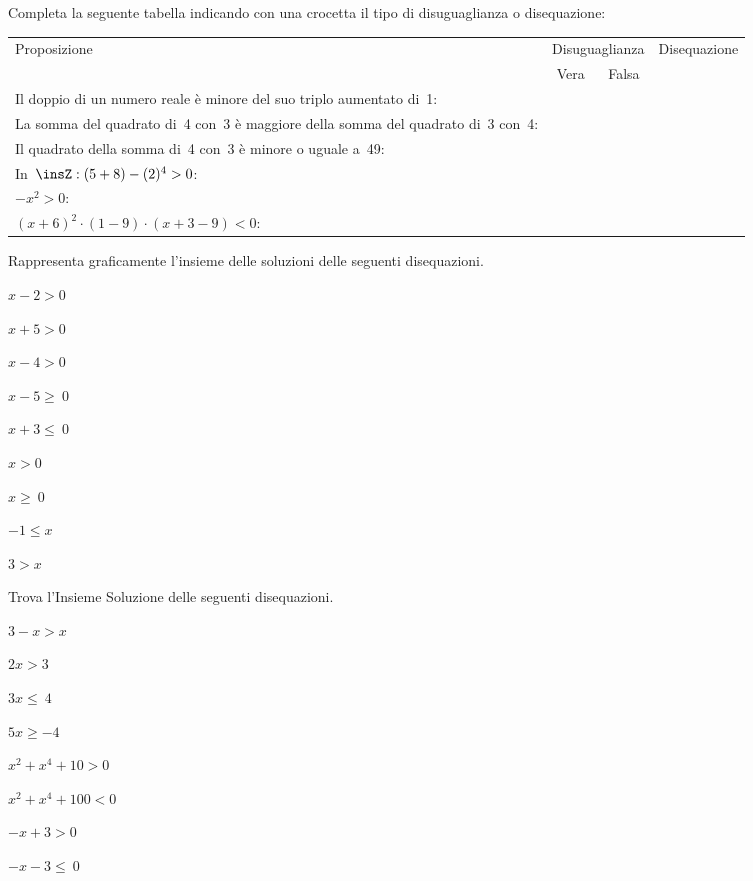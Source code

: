 \begin{esercizio}
 \label{ese:21.8}
Completa la seguente tabella indicando con una crocetta il tipo di
disuguaglianza o disequazione:

 \begin{tabularx}{.9\textwidth}{X|c|c|c|}
 \toprule
 Proposizione&\multicolumn{2}{c}{Disuguaglianza}& Disequazione\\
  & Vera & Falsa & \\
 \midrule
 Il doppio di un numero reale è minore del suo triplo aumentato di~1: & & & \\
 \midrule
 La somma del quadrato di~4 con~3 è maggiore della somma del quadrato di~3 con~4: & & &\\
 \midrule
 Il quadrato della somma di~4 con~3 è minore o uguale a~49: & & & \\
 \midrule
 In~$\insZ:(5+8)-(2)^{4}>0$: & & & \\
 \midrule
 $-x^{2}>0$: & & & \\
 \midrule
 $(x+6)^{2}\cdot (1-9)\cdot (x+3-9)<0$: & & & \\
 \bottomrule
 \end{tabularx}
\end{esercizio}

\begin{esercizio}
 \label{ese:21.9}
 Rappresenta graficamente l'insieme delle soluzioni
delle seguenti disequazioni.
\begin{multicols}{3}
 \begin{enumeratea}
 \item $x-2>0$
\item $x+5>0$
\item $x-4>0$
\item $x-5\ge~0$
\item $x+3\le~0$
\item $x>0$
\item $x\ge~0$
\item $-1\le x$
\item $3>x$
 \end{enumeratea}
\end{multicols}
\end{esercizio}

\begin{esercizio}[\Ast]
 \label{ese:21.10}
Trova l'Insieme Soluzione delle seguenti disequazioni.
\begin{multicols}{2}
 \begin{enumeratea}
 \item $3-x>x$
\item $2x>3$
\item $3x\le~4$
\item $5x\ge -4$
\item $x^{2}+x^{4}+10>0$
\item $x^{2}+x^{4}+100<0$
\item $-x+3>0$
\item $-x-3\le~0$
\end{enumeratea}
\end{multicols}
\end{esercizio}

